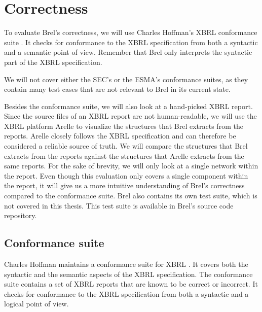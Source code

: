 \section{Correctness}
\label{sec:correctness}

To evaluate Brel's correctness, we will use Charles Hoffman's XBRL conformance suite \cite{hoffman_conformance_suite}.
It checks for conformance to the XBRL specification from both a syntactic and a semantic point of view.
Remember that Brel only interprets the syntactic part of the XBRL specification.

We will not cover either the SEC's or the ESMA's conformance suites, 
as they contain many test cases that are not relevant to Brel in its current state.

Besides the conformance suite, we will also look at a hand-picked XBRL report.
Since the source files of an XBRL report are not human-readable, 
we will use the XBRL platform Arelle\cite{arelle} to visualize the structures that Brel extracts from the reports.
Arelle closely follows the XBRL specification and can therefore be considered a reliable source of truth.
We will compare the structures that Brel extracts from the reports against the structures that Arelle extracts from the same reports.
For the sake of brevity, we will only look at a single network within the report.
Even though this evaluation only covers a single component within the report,
it will give us a more intuitive understanding of Brel's correctness compared to the conformance suite.
Brel also contains its own test suite, which is not covered in this thesis.
This test suite is available in Brel's source code repository\cite{brel_source}.

\subsection{Conformance suite}

Charles Hoffman maintains a conformance suite for XBRL \cite{hoffman_conformance_suite}.
It covers both the syntactic and the semantic aspects of the XBRL specification.
The conformance suite contains a set of XBRL reports that are known to be correct or incorrect.
It checks for conformance to the XBRL specification from both a syntactic and a logical point of view.

